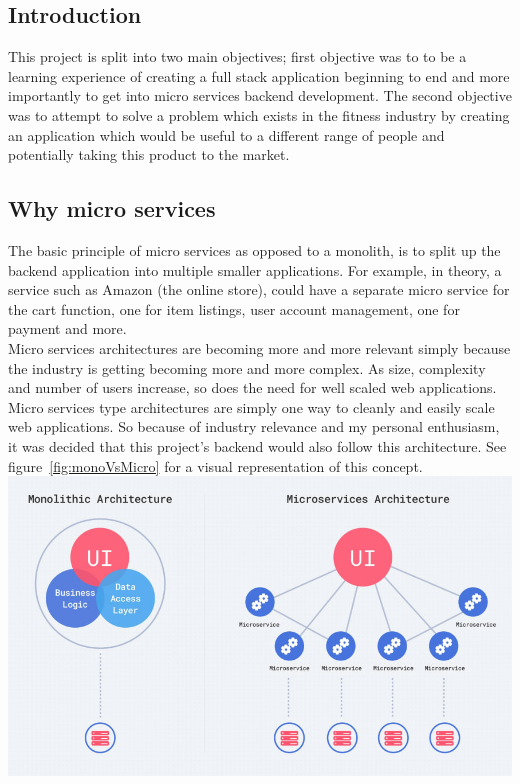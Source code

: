 \documentclass{article}
\newcommand{\vspaceconst}{-2ex}
\begin{document}
\begin{multicols}{2}
\section{Introduction}
\vspace{\vspaceconst}

This project is split into two main objectives; first objective was to to be a learning experience of creating a full stack application beginning to end and more importantly to get into micro services backend development. The second objective was to attempt to solve a problem which exists in the fitness industry by creating an application which would be useful to a different range of people and potentially taking this product to the market.\\

\subsection{Why micro services}
\vspace{\vspaceconst}

  The basic principle of micro services as opposed to a monolith, is to split up the backend application into multiple smaller applications. For example, in theory, a service such as Amazon (the online store), could have a separate micro service for the cart function, one for item listings, user account management, one for payment and more.\\
  Micro services architectures are becoming more and more relevant simply because the industry is getting becoming more and more complex. As size, complexity and number of users increase, so does the need for well scaled web applications. Micro services type architectures are simply one way to cleanly and easily scale web applications. So because of industry relevance and my personal enthusiasm, it was decided that this project's backend would also follow this architecture. See figure~\ref{fig:monoVsMicro} for a visual representation of this concept.\\

\begingroup
\centering
\includegraphics[width=0.9\linewidth]{./miscAssets/monoVsMicro.jpg}
~\label{fig:monoVsMicro}
\endgroup


\end{multicols}
\end{document}
